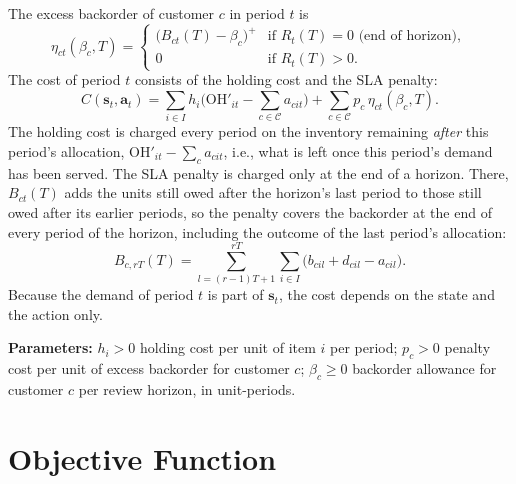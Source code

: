 \documentclass[11pt, a4paper]{article}
\theoremstyle{definition}
\theoremstyle{remark}
\newcommand{\OH}{\text{OH}}
\begin{document}
The excess backorder of customer $c$ in period $t$ is
\begin{equation}
    \eta_{ct}(\beta_c, T) = \begin{cases}
        \big(B_{ct}(T) - \beta_c\big)^+ & \text{if } R_t(T) = 0 \text{ (end of horizon)}, \\
        0 & \text{if } R_t(T) > 0.
    \end{cases}
\end{equation}
The cost of period $t$ consists of the holding cost and the SLA penalty:
\begin{equation}
    C(\mathbf{s}_t, \mathbf{a}_t) = \sum_{i \in I} h_i \Big(\OH'_{it} - \sum_{c \in \mathcal{C}} a_{cit}\Big) + \sum_{c \in \mathcal{C}} p_c \, \eta_{ct}(\beta_c, T).
\end{equation}
The holding cost is charged every period on the inventory remaining \emph{after} this period's allocation, $\OH'_{it} - \sum_{c} a_{cit}$, i.e., what is left once this period's demand has been served. The SLA penalty is charged only at the end of a horizon. There, $B_{ct}(T)$ adds the units still owed after the horizon's last period to those still owed after its earlier periods, so the penalty covers the backorder at the end of every period of the horizon, including the outcome of the last period's allocation:
\begin{equation}
    B_{c,rT}(T) = \sum_{l=(r-1)T+1}^{rT} \sum_{i \in I} \big(b_{cil} + d_{cil} - a_{cil}\big).
\end{equation}
Because the demand of period $t$ is part of $\mathbf{s}_t$, the cost depends on the state and the action only.

\textbf{Parameters:} $h_i > 0$ holding cost per unit of item $i$ per period; $p_c > 0$ penalty cost per unit of excess backorder for customer $c$; $\beta_c \geq 0$ backorder allowance for customer $c$ per review horizon, in unit-periods.

\newpage
\section{Objective Function}
\label{sec:objective}
\end{document}
